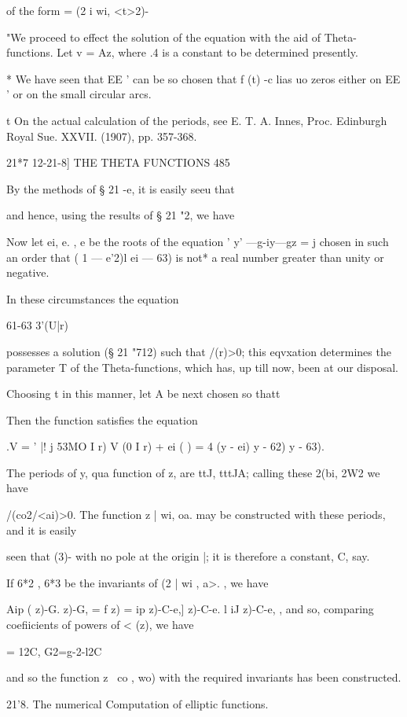 of the form = (2 i wi, <t>2)-

"We proceed to effect the solution of the equation with the aid of
Theta-functions. Let v = Az, where .4 is a constant to be determined
presently.

* We have seen that EE ' can be so chosen that f (t) -c lias uo zeros
either on EE ' or on the small circular arcs.

t On the actual calculation of the periods, see E. T. A. Innes, Proc.
Edinburgh Royal Sue. XXVII. (1907), pp. 357-368.

21*7 12-21-8] THE THETA FUNCTIONS 485

By the methods of § 21 -e, it is easily seeu that

and hence, using the results of § 21 "2, we have

Now let ei, e. , e be the roots of the equation ' y' —g-iy—gz = j
chosen in such an order that ( 1 — e'2)l ei — 63) is not* a real
number greater than unity or negative.

In these circumstances the equation

61-63 3'(U|r)

possesses a solution (§ 21 "712) such that /(r)>0; this eqvxation
determines the parameter T of the Theta-functions, which has, up till
now, been at our disposal.

Choosing t in this manner, let A be next chosen so thatt

Then the function satisfies the equation

.V = ' |! j 53MO I r) V (0 I r) + ei ( ) = 4 (y - ei) y - 62) y - 63).

The periods of y, qua function of z, are ttJ, tttJA; calling these
2(bi, 2W2 we have

/(co2/<ai)>0. The function z | wi, oa. may be constructed with these
periods, and it is easily

seen that (3)- %
with no pole at the origin |; it is therefore a constant, C, say.

If 6*2 , 6*3 be the invariants of (2 | wi , a>. , we have

Aip ( z)-G. z)-G, = f z) = ip z)-C-e,] z)-C-e. l iJ z)-C-e, , and so,
comparing coefiicients of powers of < (z), we have

= 12C, G2=g-2-l2C%

and so the function z \ co , wo) with the required invariants has been
constructed.

21'8. The numerical Computation of elliptic functions.

